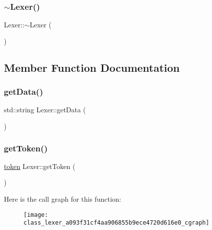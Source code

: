 \mbox{\label{class_lexer_ad26a84af23d8d303723e36e83fc4e556}} 
\subsubsection{\texorpdfstring{$\sim$Lexer()}{~Lexer()}}
{\footnotesize\ttfamily Lexer\+::$\sim$\+Lexer (\begin{DoxyParamCaption}{ }\end{DoxyParamCaption})}



\subsection{Member Function Documentation}
\mbox{\label{class_lexer_a883a5a701c3c4ff9079196a9a4442fab}} 
\subsubsection{\texorpdfstring{getData()}{getData()}}
{\footnotesize\ttfamily std\+::string Lexer\+::get\+Data (\begin{DoxyParamCaption}{ }\end{DoxyParamCaption})}

\mbox{\label{class_lexer_a093f31cf4aa906855b9ece4720d616e0}} 
\subsubsection{\texorpdfstring{getToken()}{getToken()}}
{\footnotesize\ttfamily \mbox{\hyperlink{structtoken}{token}} Lexer\+::get\+Token (\begin{DoxyParamCaption}{ }\end{DoxyParamCaption})}

Here is the call graph for this function\+:
\nopagebreak
\begin{figure}[H]
\begin{center}
\leavevmode
\texttt{[image: class\_lexer\_a093f31cf4aa906855b9ece4720d616e0\_cgraph]}
\end{center}
\end{figure}
\mbox{\label{class_lexer_a50b447b200b69d2bd17b5971f570ed62}} 
